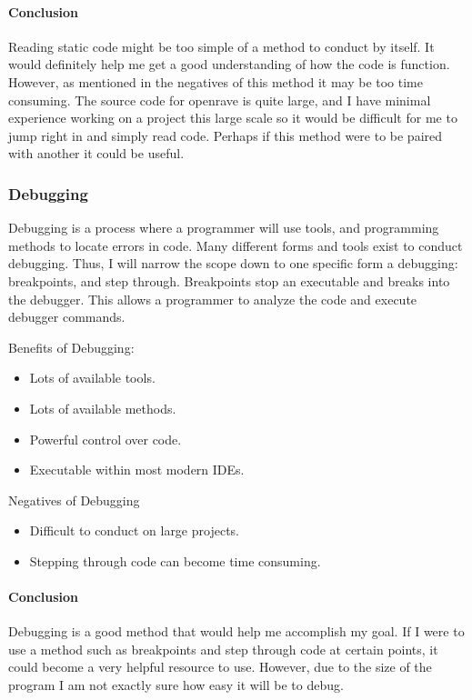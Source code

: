 \documentclass[10pt,journal,compsoc,draftclsnofoot]{IEEEtran}
\begin{document}
\paragraph{Conclusion}
\vspace{3mm}
Reading static code might be too simple of a method to conduct by itself.
It would definitely help me get a good understanding of how the code is function.
However, as mentioned in the negatives of this method it may be too time consuming.
The source code for openrave is quite large, and I have minimal experience working on a project this large scale so it would be difficult for me to jump right in and simply read code.
Perhaps if this method were to be paired with another it could be useful.

\subsubsection{Debugging}
Debugging is a process where a programmer will use tools, and programming methods to locate errors in code.
Many different forms and tools exist to conduct debugging.\cite{debugging}
Thus, I will narrow the scope down to one specific form a debugging: breakpoints, and step through.
Breakpoints stop an executable and breaks into the debugger.
This allows a programmer to analyze the code and execute debugger commands.\cite{debugging}

Benefits of Debugging:
\begin{itemize}
\item Lots of available tools.
\item Lots of available methods.
\item Powerful control over code.
\item Executable within most modern IDEs.
\end{itemize}

Negatives of Debugging
\begin{itemize}
\item Difficult to conduct on large projects.
\item Stepping through code can become time consuming.
\end{itemize}

\paragraph{Conclusion}
\vspace{3mm}
Debugging is a good method that would help me accomplish my goal.
If I were to use a method such as breakpoints and step through code at certain points, it could become a very helpful resource to use.
However, due to the size of the program I am not exactly sure how easy it will be to debug.
\end{document}
